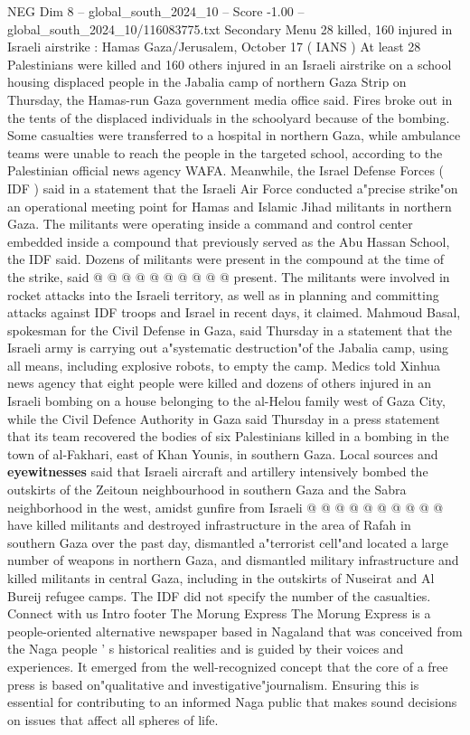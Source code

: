 \begin{textsample}{NEG Dim 8 – global\_south\_2024\_10 – Score -1.00 – global\_south\_2024\_10/116083775.txt}  \label{ex:f8_neg_199}
Secondary Menu 28 killed, 160 injured in Israeli airstrike : Hamas Gaza/Jerusalem, October 17 ( IANS ) At least 28 Palestinians were killed and 160 others injured in an Israeli airstrike on a school housing displaced people in the Jabalia camp of northern Gaza Strip on Thursday, the Hamas-run Gaza government media office said.
Fires broke out in the tents of the displaced individuals in the schoolyard because of the bombing.
Some casualties were transferred to a hospital in northern Gaza, while ambulance teams were unable to reach the people in the targeted school, according to the Palestinian official news agency WAFA.
Meanwhile, the Israel Defense Forces ( IDF ) said in a statement that the Israeli Air Force conducted a"precise strike"on an operational meeting point for Hamas and Islamic Jihad militants in northern Gaza.
The militants were operating inside a command and control center embedded inside a compound that previously served as the Abu Hassan School, the IDF said.
Dozens of militants were present in the compound at the time of the strike, said @ @ @ @ @ @ @ @ @ @ present.
The militants were involved in rocket attacks into the Israeli territory, as well as in planning and committing attacks against IDF troops and Israel in recent days, it claimed.
Mahmoud Basal, spokesman for the Civil Defense in Gaza, said Thursday in a statement that the Israeli army is carrying out a"systematic destruction"of the Jabalia camp, using all means, including explosive robots, to empty the camp.
Medics told Xinhua news agency that eight people were killed and dozens of others injured in an Israeli bombing on a house belonging to the al-Helou family west of Gaza City, while the Civil Defence Authority in Gaza said Thursday in a press statement that its team recovered the bodies of six Palestinians killed in a bombing in the town of al-Fakhari, east of Khan Younis, in southern Gaza.
Local sources and \textbf{eyewitnesses} said that Israeli aircraft and artillery intensively bombed the outskirts of the Zeitoun neighbourhood in southern Gaza and the Sabra neighborhood in the west, amidst gunfire from Israeli @ @ @ @ @ @ @ @ @ @ have killed militants and destroyed infrastructure in the area of Rafah in southern Gaza over the past day, dismantled a"terrorist cell"and located a large number of weapons in northern Gaza, and dismantled military infrastructure and killed militants in central Gaza, including in the outskirts of Nuseirat and Al Bureij refugee camps.
The IDF did not specify the number of the casualties.
Connect with us Intro footer The Morung Express The Morung Express is a people-oriented alternative newspaper based in Nagaland that was conceived from the Naga people ' s historical realities and is guided by their voices and experiences.
It emerged from the well-recognized concept that the core of a free press is based on"qualitative and investigative"journalism.
Ensuring this is essential for contributing to an informed Naga public that makes sound decisions on issues that affect all spheres of life.

\end{textsample}
